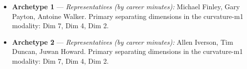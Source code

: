 \begin{itemize}
\item \textbf{Archetype 1} --- \emph{Representatives (by career minutes):} Michael Finley, Gary Payton, Antoine Walker. Primary separating dimensions in the curvature-m1 modality: Dim 7, Dim 4, Dim 2.
\item \textbf{Archetype 2} --- \emph{Representatives (by career minutes):} Allen Iverson, Tim Duncan, Juwan Howard. Primary separating dimensions in the curvature-m1 modality: Dim 7, Dim 4, Dim 2.
\end{itemize}
